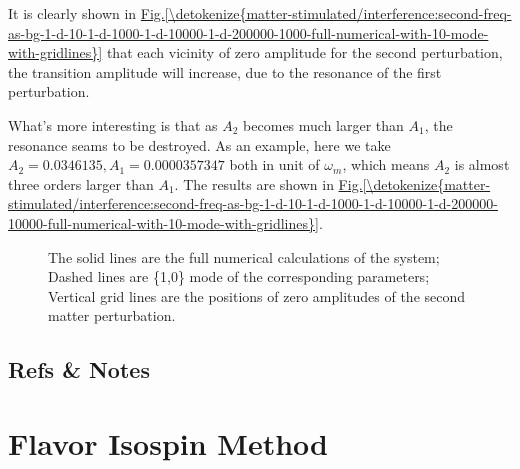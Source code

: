 \documentclass[letterpaper,12pt,english]{sphinxmanual}
\begin{document}
It is clearly shown in \hyperref[\detokenize{matter-stimulated/interference:second-freq-as-bg-1-d-10-1-d-1000-1-d-10000-1-d-200000-1000-full-numerical-with-10-mode-with-gridlines}]{Fig.\@ \ref{\detokenize{matter-stimulated/interference:second-freq-as-bg-1-d-10-1-d-1000-1-d-10000-1-d-200000-1000-full-numerical-with-10-mode-with-gridlines}}} that each vicinity of zero amplitude for the second perturbation, the transition amplitude will increase, due to the resonance of the first perturbation.

What's more interesting is that as \(A_2\) becomes much larger than \(A_1\), the resonance seams to be destroyed. As an example, here we take \(A_2=0.0346135, A_1=0.0000357347\) both in unit of \(\omega_m\), which means \(A_2\) is almost three orders larger than \(A_1\). The results are shown in \hyperref[\detokenize{matter-stimulated/interference:second-freq-as-bg-1-d-10-1-d-1000-1-d-10000-1-d-200000-10000-full-numerical-with-10-mode-with-gridlines}]{Fig.\@ \ref{\detokenize{matter-stimulated/interference:second-freq-as-bg-1-d-10-1-d-1000-1-d-10000-1-d-200000-10000-full-numerical-with-10-mode-with-gridlines}}}.
\begin{figure}[htbp]
\centering
\capstart

\noindent{}
\caption{The solid lines are the full numerical calculations of the system; Dashed lines are \{1,0\} mode of the corresponding parameters; Vertical grid lines are the positions of zero amplitudes of the second matter perturbation.}\label{\detokenize{matter-stimulated/interference:second-freq-as-bg-1-d-10-1-d-1000-1-d-10000-1-d-200000-10000-full-numerical-with-10-mode-with-gridlines}}\label{\detokenize{matter-stimulated/interference:id8}}\end{figure}


\subsection{Refs \& Notes}
\label{\detokenize{matter-stimulated/interference:refs-notes}}

\section{Flavor Isospin Method}
\label{\detokenize{matter-stimulated/flavor-isospin-matter::doc}}\label{\detokenize{matter-stimulated/flavor-isospin-matter:flavor-isospin-method}}
\end{document}
